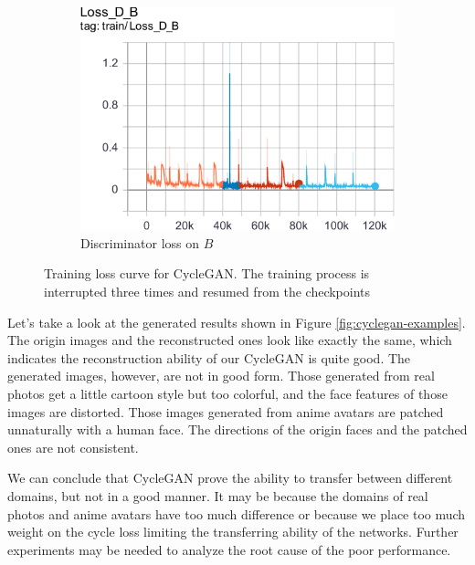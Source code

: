 \documentclass[10pt,twocolumn,letterpaper]{article}
\begin{document}
\begin{figure}[h]
\begin{subfigure}{.24\linewidth}
      \includegraphics[width=\linewidth]{cyclegan-loss_d_b}
      \caption{Discriminator loss on $B$}
   \end{subfigure}
   \caption{Training loss curve for CycleGAN. The training process is
   interrupted three times and resumed from the checkpoints}
   \label{fig:cyclegan-loss}
\end{figure}

Let's take a look at the generated results shown in Figure
\ref{fig:cyclegan-examples}. The origin images and the reconstructed ones look
like exactly the same, which indicates the reconstruction ability of our
CycleGAN is quite good. The generated images, however, are not in good form.
Those generated from real photos get a little cartoon style but too colorful,
and the face features of those images are distorted. Those images generated from
anime avatars are patched unnaturally with a human face. The directions of the
origin faces and the patched ones are not consistent.

We can conclude that CycleGAN prove the ability to transfer between different
domains, but not in a good manner. It may be because the domains of real photos
and anime avatars have too much difference or because we place too much weight
on the cycle loss limiting the transferring ability of the networks. Further
experiments may be needed to analyze the root cause of the poor performance.
\end{document}

